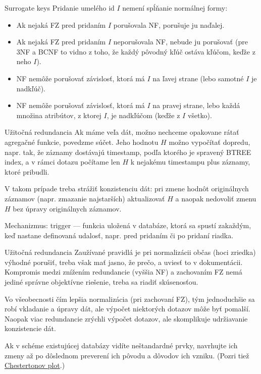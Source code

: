 \documentclass[12pt]{beamer}
\begin{document}
\begin{frame}[fragile]{Surrogate keys}
Pridanie umelého id $I$ nemení spĺňanie normálnej formy:
\begin{itemize}
\item Ak nejaká FZ pred pridaním $I$ porušovala NF, porušuje ju naďalej.
\item Ak nejaká FZ pred pridaním $I$ neporušovala NF, nebude ju porušovať
    (pre 3NF a BCNF to vidno z toho, že každý pôvodný kľúč ostáva kľúčom, keďže z neho  $I$).
\item NF nemôže porušovať závislosť, ktorá má $I$ na ľavej strane (lebo samotné $I$ je nadkľúč).
\item NF nemôže porušovať závislosť, ktorá má $I$ na pravej strane,
lebo každá množina atribútov, z ktorej  $I$, je nadkľúčom (keďže z $I$  všetko).
\end{itemize}
\end{frame}


\begin{frame}{Užitočná redundancia}
Ak máme veľa dát, možno nechceme opakovane rátať agregačné funkcie, povedzme súčet.
Jeho hodnotu $H$ možno vypočítať dopredu, napr. tak, že záznamy dostávajú timestamp,
podľa ktorého je spravený BTREE index, a v rámci dotazu počítame
len $H$ k nejakému timestampu plus záznamy, ktoré pribudli.

\bigskip
V takom prípade treba strážiť konzistenciu dát: pri zmene hodnôt originálnych záznamov
(napr. zmazanie najstarších) aktualizovať $H$ a naopak nedovoliť zmenu $H$ bez úpravy originálnych záznamov.

\bigskip
Mechanizmus: \alert{trigger} --- funkcia uložená v databáze, ktorá sa spustí zakaždým,
keď nastane definovaná udalosť, napr. pred pridaním či po pridaní riadka.
\end{frame}

\begin{frame}{Užitočná redundancia}
Zaužívané pravidlá je pri normalizácii občas (hoci zriedka) výhodné porušiť,
treba však mať jasno, že prečo, a uviesť to v dokumentácii.
Kompromis medzi znížením redundancie (vyššia NF) a zachovaním FZ nemá
jediné správne objektívne riešenie, treba sa riadiť skúsenosťou.
\bigskip

Vo všeobecnosti čím lepšia normalizácia (pri zachovaní FZ),
tým jednoduchšie sa robí vkladanie a úpravy dát, ale výpočet niektorých dotazov môže byť pomalší.
Naopak viac redundancie zrýchli výpočet dotazov, ale skomplikuje udržiavanie konzistencie dát.

Ak v schéme existujúcej databázy vidíte neštandardné prvky,
navrhujte ich zmeny až po dôslednom preverení ich pôvodu a dôvodov ich vzniku.
(Pozri tiež \href{https://fs.blog/chestertons-fence/}{Chestertonov plot}.)
\end{frame}
\end{document}
